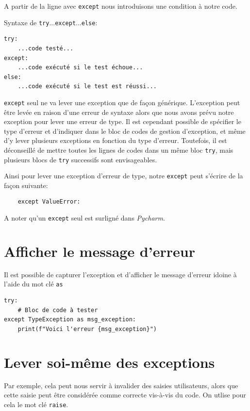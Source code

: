 \documentclass[a4paper,11pt]{book}
\begin{document}
A partir de la ligne avec \texttt{except} nous introduisons une condition à notre code.
\medskip

Syntaxe de \texttt{try}...\texttt{except}...\texttt{else}:
\begin{lstlisting}
try:
    ...code testé...
except:
    ...code exécuté si le test échoue...
else:
    ...code exécuté si le test est réussi...
\end{lstlisting}
\medskip

\texttt{except} seul ne va lever une exception que de façon générique. L'exception peut être levée en raison d'une erreur de syntaxe alors que nous avons prévu notre exception pour lever une erreur de type. Il est cependant possible de spécifier le type d'erreur et d'indiquer dans le bloc de codes de gestion d'exception, et même d'y lever plusieurs exceptions en fonction du type d'erreur. Toutefois, il est déconseillé de mettre toutes les lignes de codes dans un même bloc \texttt{try}, mais plusieurs blocs de \texttt{try} successifs sont envisageables.
\medskip

Ainsi pour lever une exception d'erreur de type, notre \texttt{except} peut s'écrire de la façon suivante:
\begin{verbatim}
    except ValueError:
\end{verbatim}
\medskip

A noter qu'un \texttt{except} seul est surligné dans \textit{Pycharm}.
\medskip

\section{Afficher le message d'erreur}
Il est possible de capturer l'exception et d'afficher le message d'erreur idoine à l'aide du mot clé \texttt{as}
\begin{lstlisting}
try:
    # Bloc de code à tester
except TypeException as msg_exception:
    print(f"Voici l'erreur {msg_exception}")
\end{lstlisting}
\medskip

\section{Lever soi-même des exceptions}
Par exemple, cela peut nous servir à invalider des saisies utilisateurs, alors que cette saisie peut être considérée comme correcte vis-à-vis du code. On utlise pour cela le mot clé \texttt{raise}.
\medskip
\end{document}

